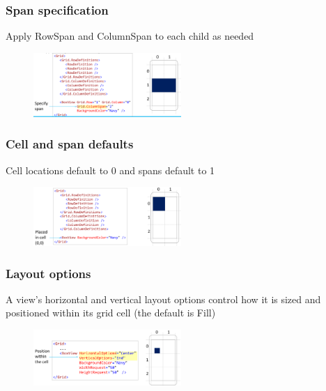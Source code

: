 \documentclass{article}
\begin{document}
\subsubsection{Span specification}

Apply RowSpan and ColumnSpan to each child as needed

\begin{figure}[H]
    \centering
    \includegraphics[width=0.5\textwidth]{xaml-grid-span.png}
    \caption{}
\end{figure}

\subsubsection{Cell and span defaults}

Cell locations default to 0 and spans default to 1

\begin{figure}[H]
    \centering
    \includegraphics[width=0.5\textwidth]{xaml-grid-cell-span-defaults.png}
    \caption{}
\end{figure}

\subsubsection{Layout options}

A view's horizontal and vertical layout options control how it is sized and positioned within its grid cell (the default is Fill)

\begin{figure}[H]
    \centering
    \includegraphics[width=0.5\textwidth]{xaml-grid-layout.png}
    \caption{}
\end{figure}
\end{document}
